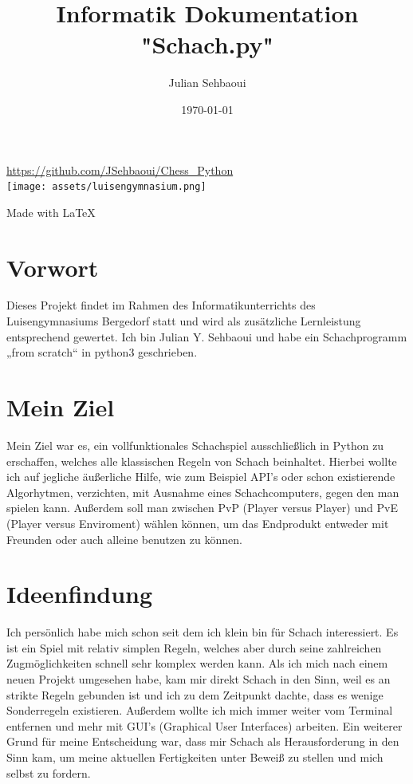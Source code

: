 \documentclass[a4paper, 10pt]{scrartcl}
\title{Informatik Dokumentation "Schach.py"}
\author{Julian Sehbaoui}
\date{\today}
\begin{document}
\begin{titlepage}
        \maketitle
        \centering
        \url{https://github.com/JSehbaoui/Chess_Python}\\
         \vspace{5pt} 
        \texttt{[image: assets/luisengymnasium.png]}\\
         \vspace{5pt} 
        
        Made with \LaTeX{}
\end{titlepage}

\pagebreak
\tableofcontents
\pagebreak

\section{Vorwort}
Dieses Projekt findet im Rahmen des Informatikunterrichts des Luisengymnasiums 	Bergedorf statt und wird als zusätzliche Lernleistung entsprechend gewertet.
Ich bin Julian Y. Sehbaoui und habe ein Schachprogramm „from scratch“ in python3 geschrieben.

\section{Mein Ziel}
Mein Ziel war es, ein vollfunktionales Schachspiel ausschließlich in Python
zu erschaffen, welches alle klassischen Regeln von Schach beinhaltet. 
Hierbei wollte ich auf jegliche äußerliche Hilfe, wie zum Beispiel API's oder schon
existierende Algorhytmen, verzichten, mit Ausnahme eines Schachcomputers, gegen den man spielen kann. 
Außerdem soll man zwischen PvP (Player versus Player) und PvE (Player versus Enviroment) wählen können,
um das Endprodukt entweder mit Freunden oder auch alleine benutzen zu können.

\section{Ideenfindung}
Ich persönlich habe mich schon seit dem ich klein bin für Schach interessiert.
Es ist ein Spiel mit relativ simplen Regeln, welches aber durch seine zahlreichen Zugmöglichkeiten schnell sehr komplex werden kann.
Als ich mich nach einem neuen Projekt umgesehen habe, kam mir direkt Schach in den Sinn, weil es an strikte Regeln gebunden ist und
ich zu dem Zeitpunkt dachte, dass es wenige Sonderregeln existieren.
Außerdem wollte ich mich immer weiter vom Terminal entfernen und mehr mit
GUI's (Graphical User Interfaces) arbeiten. Ein weiterer Grund für meine Entscheidung war,
dass mir Schach als Herausforderung in den Sinn kam, um meine aktuellen Fertigkeiten
unter Beweiß zu stellen und mich selbst zu fordern.
\end{document}
